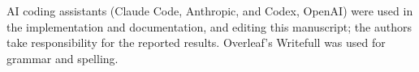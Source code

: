 \documentclass[sigconf]{acmart}
\begin{document}
AI coding assistants (Claude Code, Anthropic, and Codex, OpenAI) were used in the implementation and documentation, and editing this manuscript; the authors take responsibility for the reported results. Overleaf's Writefull was used for grammar and spelling.



\end{document}
